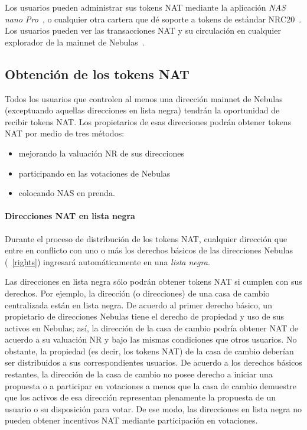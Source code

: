 Los usuarios pueden administrar sus tokens NAT mediante la aplicación \textit{NAS nano Pro}~\cite{NASnano}, o cualquier otra cartera que dé soporte a tokens de estándar NRC20~\cite{wallets}. Los usuarios pueden ver las transacciones NAT y su circulación en cualquier explorador \blockchain de la mainnet de Nebulas~\cite{explorer}.

\subsection{Obtención de los tokens NAT}

Todos los usuarios que controlen al menos una dirección mainnet de Nebulas (exceptuando aquellas direcciones en lista negra) tendrán la oportunidad de recibir tokens NAT. Los propietarios de esas direcciones podrán obtener tokens NAT por medio de tres métodos:

\begin{itemize}
	\item mejorando la valuación NR de sus direcciones
	\item participando en las votaciones \onchain de Nebulas
	\item colocando NAS en prenda.
\end{itemize}

\paragraph{Direcciones NAT en lista negra}

Durante el proceso de distribución de los tokens NAT, cualquier dirección que entre en conflicto con uno o más los derechos básicos de las direcciones Nebulas (~\ref{rights}) ingresará automáticamente en una \textit{lista negra}.

Las direcciones en lista negra sólo podrán obtener tokens NAT si cumplen con sus derechos. Por ejemplo, la dirección (o direcciones) de una casa de cambio centralizada están en lista negra. De acuerdo al primer derecho básico, un propietario de direcciones Nebulas tiene el derecho de propiedad y uso de sus activos en Nebulas; así, la dirección de la casa de cambio podría obtener NAT de acuerdo a su valuación NR y bajo las mismas condiciones que otros usuarios. No obstante, la propiedad (es decir, los tokens NAT) de la casa de cambio deberían ser distribuidos a sus correspondientes usuarios. De acuerdo a los derechos básicos restantes, la dirección de la casa de cambio no posee derecho a iniciar una propuesta o a participar en votaciones a menos que la casa de cambio demuestre que los activos de esa dirección representan plenamente la propuesta de un usuario o su disposición para votar. De ese modo, las direcciones en lista negra no pueden obtener incentivos NAT mediante participación en votaciones.

